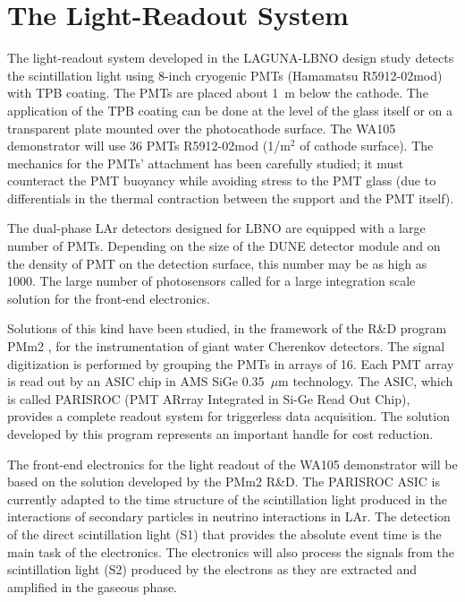 \section{The Light-Readout System} 
\label{sec:detectors-fd-alt-light}

The light-readout system developed in the LAGUNA-LBNO design study
detects the scintillation light using 8-inch cryogenic
PMTs (Hamamatsu R5912-02mod) with TPB coating. The PMTs
are placed about 1~m below the cathode.  The application of the TPB
coating can be done at the level of the glass itself or on a
transparent plate mounted over the photocathode surface. The WA105
demonstrator will use 36 PMTs R5912-02mod (1/m$^2$ of
cathode surface). The mechanics for the PMTs' attachment has been
carefully studied; it must counteract the PMT buoyancy while avoiding
stress to the PMT glass (due to differentials in the thermal
contraction between the support and the PMT itself).

The dual-phase LAr detectors designed for LBNO are equipped with a
large number of PMTs. Depending on the size of the DUNE detector module and on the
density of PMT on the detection surface, this number may be as high as
1000. The large number of photosensors called for a large integration
scale solution for the front-end electronics.

Solutions of this kind have been studied, in the framework of the
R\&D program PMm2 \cite{PMM2-1, PMM2-2}, for the instrumentation of
giant water Cherenkov detectors. The signal
digitization is performed by grouping the PMTs in arrays
of 16. Each PMT array is read out by an ASIC chip in AMS
SiGe 0.35~$\mu$m technology. The ASIC, which is called PARISROC
(PMT ARrray Integrated in Si-Ge Read Out
Chip)\cite{Parisroc}, provides a complete readout system for
triggerless data acquisition. The solution developed by this program
represents an important handle for cost reduction.



The front-end electronics for the light readout of the WA105
demonstrator will be based on the solution developed by the PMm2
R\&D. The PARISROC ASIC is currently
adapted to the time structure of the scintillation light produced in
the interactions of secondary particles in neutrino interactions in
LAr. The detection of the direct scintillation light (S1) that
provides the absolute event time is the main task of the electronics.
The electronics will also process the signals from the scintillation
light (S2) produced by the electrons as they are extracted and
amplified in the gaseous phase.


